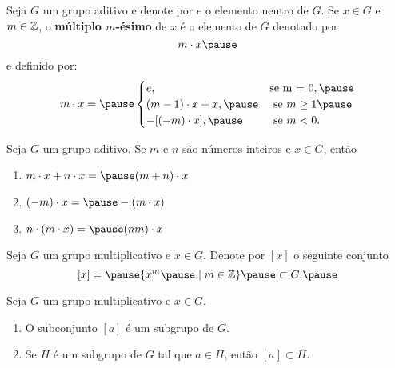 \documentclass{beamer}
\begin{document}
    \begin{frame}
        Seja $G$ um grupo aditivo \pause e denote por $e$ o elemento neutro de $G$. \pause Se $x \in G$ \pause e $m \in \mathbb{Z}$, \pause o \textbf{m\'ultiplo $m$-\'esimo} de $x$ \pause \'e o elemento de $G$ denotado por \pause
        \[
            m \cdot x \pause
        \]
        e definido por:
        \[
            m \cdot x = \pause \begin{cases}
                    e, & \mbox{se m = 0}, \pause\\
                    (m - 1)\cdot x + x, \pause & \mbox{ se } m \ge 1 \pause\\
                    -[(-m) \cdot x], \pause & \mbox{ se } m < 0. 
                   \end{cases}
        \]
    \end{frame}

    \begin{frame}
        \begin{proposicao}
            Seja $G$ um grupo aditivo. \pause Se $m$ e $n$ s\~ao n\'umeros inteiros \pause e $x \in G$, ent\~ao \pause
            \begin{enumerate}[label={\roman*})]
                \item $m \cdot x + n \cdot x = \pause (m + n) \cdot x$ \pause

                \item $(-m) \cdot x = \pause -(m \cdot x)$ \pause

                \item $n\cdot (m \cdot x) = \pause (nm)\cdot x$
            \end{enumerate}
        \end{proposicao}
    \end{frame}

    \begin{frame}
        Seja $G$ um grupo multiplicativo \pause e $x \in G$. \pause Denote por $[x]$ \pause o seguinte conjunto \pause
        \[
            [x] = \pause \{x^m \pause \mid m \in \z\} \pause \subset G.\pause
        \]

        \begin{proposicao}
            Seja $G$ um grupo multiplicativo \pause e $x \in G$. \pause
            \begin{enumerate}[label={\roman*})]
                \item O subconjunto $[a]$ \pause \'e um subgrupo de $G$.\pause

                \item Se $H$ \'e um subgrupo de $G$ \pause tal que $a \in H$, \pause ent\~ao $[a] \subset H$.
            \end{enumerate}
        \end{proposicao}
    \end{frame}
\end{document}
